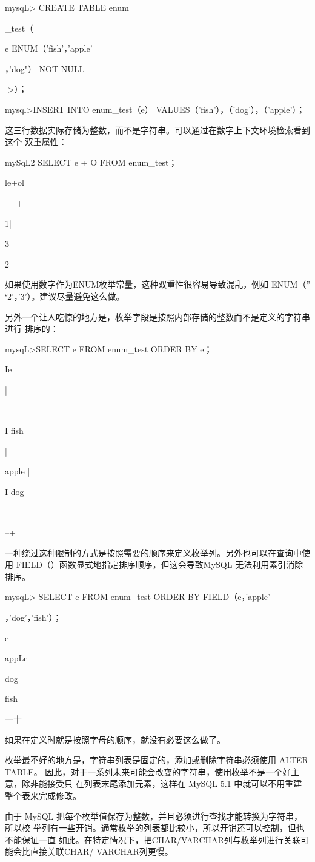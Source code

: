 mysqL> CREATE TABLE enum

\_test（

e ENUM（'fish'，'apple'

，'dog"） NOT NULL

->）；

mysql>INSERT INTO enum\_test（e） VALUES（'fish'），（'dog'），（'apple'）；

这三行数据实际存储为整数，而不是字符串。可以通过在数字上下文环境检索看到这个
双重属性：

mySqL2 SELECT e + O FROM enum\_test；

le+ol

----+

1|

3

2

如果使用数字作为ENUM枚举常量，这种双重性很容易导致混乱，例如 ENUM（''
‘2'，'3'）。建议尽量避免这么做。

另外一个让人吃惊的地方是，枚举字段是按照内部存储的整数而不是定义的字符串进行
排序的：

mysqL>SELECT e FROM enum\_test ORDER BY e；

Ie

|

------+

I fish

|

apple |

I dog

+-

--+

一种绕过这种限制的方式是按照需要的顺序来定义枚举列。另外也可以在查询中使用
FIELD（）函数显式地指定排序顺序，但这会导致MySQL 无法利用素引消除排序。

mysqL> SELECT e FROM enum\_test ORDER BY FIELD（e，'apple'

，'dog'，'fish'）；

e

appLe

dog

fish

一十

如果在定义时就是按照字母的顺序，就没有必要这么做了。

枚举最不好的地方是，字符串列表是固定的，添加或删除字符串必须使用 ALTER TABLE。
因此，对于一系列未来可能会改变的字符串，使用枚举不是一个好主意，除非能接受只
在列表末尾添加元素，这样在 MySQL 5.1 中就可以不用重建整个表来完成修改。

由于 MySQL 把每个枚举值保存为整数，并且必须进行查找才能转换为字符串，所以校
举列有一些开销。通常枚举的列表都比较小，所以开销还可以控制，但也不能保证一直
如此。在特定情况下，把CHAR/VARCHAR列与枚举列进行关联可能会比直接关联CHAR/
VARCHAR列更慢。

